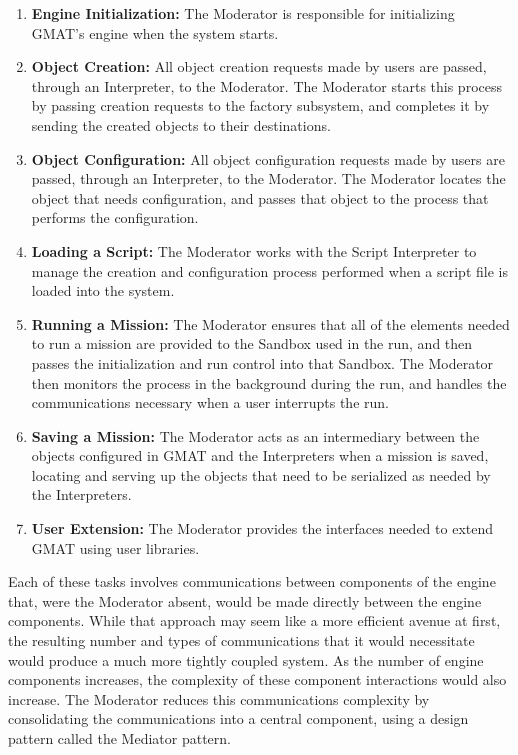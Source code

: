 \begin{enumerate}
\item \textbf{Engine Initialization:}  The Moderator is responsible for initializing GMAT's engine
when the system starts.
\item \textbf{Object Creation:}  All object creation requests made by users are passed, through an
Interpreter, to the Moderator.  The Moderator starts this process by passing creation requests to
the factory subsystem, and completes it by sending the created objects to their destinations.
\item \textbf{Object Configuration:}  All object configuration requests made by users are passed,
through an Interpreter, to the Moderator.  The Moderator locates the object that needs
configuration, and passes that object to the process that performs the configuration.
\item \textbf{Loading a Script:}  The Moderator works with the Script Interpreter to manage the
creation and configuration process performed when a script file is loaded into the system.
\item \textbf{Running a Mission:}  The Moderator ensures that all of the elements needed to run a
mission are provided to the Sandbox used in the run, and then passes the initialization and run
control into that Sandbox.  The Moderator then monitors the process in the background during the
run, and handles the communications necessary when a user interrupts the run.
\item \textbf{Saving a Mission:}  The Moderator acts as an intermediary between the objects
configured in GMAT and the Interpreters when a mission is saved, locating and serving up the
objects that need to be serialized as needed by the Interpreters.
\item \textbf{User Extension:}  The Moderator provides the interfaces needed to extend GMAT using
user libraries.
\end{enumerate}

Each of these tasks involves communications between components of the engine that, were the
Moderator absent, would be made directly between the engine components.  While that approach may
seem like a more efficient avenue at first, the resulting number and types of communications that
it would necessitate would produce a much more tightly coupled system.  As the number of engine
components increases, the complexity of these component interactions would also increase.  The
Moderator reduces this communications complexity by consolidating the communications into a central
component, using a design pattern called the Mediator pattern.

